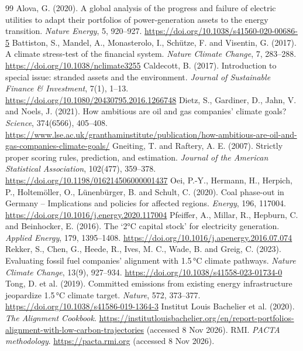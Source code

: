 \documentclass[11pt,a4paper]{article}
\begin{document}
\begin{thebibliography}{99}\small\sloppy
{} Alova, G. (2020). A global analysis of the progress and failure of electric utilities to adapt their portfolios of power-generation assets to the energy transition. \emph{Nature Energy}, 5, 920--927. \url{https://doi.org/10.1038/s41560-020-00686-5}
 Battiston, S., Mandel, A., Monasterolo, I., Schütze, F. and Visentin, G. (2017). A climate stress-test of the financial system. \emph{Nature Climate Change}, 7, 283--288. \url{https://doi.org/10.1038/nclimate3255}
 Caldecott, B. (2017). Introduction to special issue: stranded assets and the environment. \emph{Journal of Sustainable Finance \& Investment}, 7(1), 1--13. \url{https://doi.org/10.1080/20430795.2016.1266748}
 Dietz, S., Gardiner, D., Jahn, V. and Noels, J. (2021). How ambitious are oil and gas companies' climate goals? \emph{Science}, 374(6566), 405--408. \url{https://www.lse.ac.uk/granthaminstitute/publication/how-ambitious-are-oil-and-gas-companies-climate-goals/}
 Gneiting, T. and Raftery, A. E. (2007). Strictly proper scoring rules, prediction, and estimation. \emph{Journal of the American Statistical Association}, 102(477), 359--378. \url{https://doi.org/10.1198/016214506000001437}
 Oei, P.-Y., Hermann, H., Herpich, P., Holtemöller, O., Lünenbürger, B. and Schult, C. (2020). Coal phase-out in Germany -- Implications and policies for affected regions. \emph{Energy}, 196, 117004. \url{https://doi.org/10.1016/j.energy.2020.117004}
 Pfeiffer, A., Millar, R., Hepburn, C. and Beinhocker, E. (2016). The `2°C capital stock' for electricity generation. \emph{Applied Energy}, 179, 1395--1408. \url{https://doi.org/10.1016/j.apenergy.2016.07.074}
 Rekker, S., Chen, G., Heede, R., Ives, M. C., Wade, B. and Greig, C. (2023). Evaluating fossil fuel companies' alignment with 1.5\,°C climate pathways. \emph{Nature Climate Change}, 13(9), 927--934. \url{https://doi.org/10.1038/s41558-023-01734-0}
 Tong, D. et al. (2019). Committed emissions from existing energy infrastructure jeopardize 1.5\,°C climate target. \emph{Nature}, 572, 373--377. \url{https://doi.org/10.1038/s41586-019-1364-3}
 Institut Louis Bachelier et al. (2020). \emph{The Alignment Cookbook}. \url{https://institutlouisbachelier.org/en/report-portfolios-alignment-with-low-carbon-trajectories} (accessed 8 Nov 2026).
 RMI. \emph{PACTA methodology}. \url{https://pacta.rmi.org} (accessed 8 Nov 2026).

\end{thebibliography}
\end{document}
